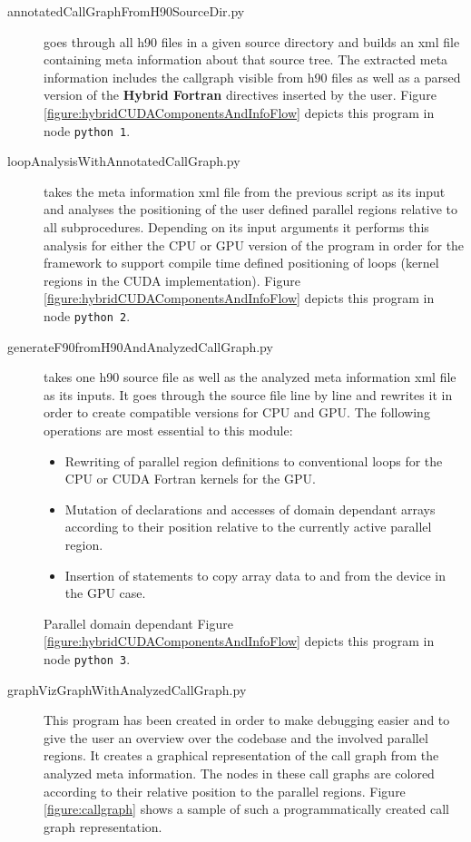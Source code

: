 \begin{description}
 \item[annotatedCallGraphFromH90SourceDir.py] goes through all h90 files in a given source directory and builds an xml file containing meta information about that source tree. The extracted meta information includes the callgraph visible from h90 files as well as a parsed version of the \textbf{Hybrid Fortran} directives inserted by the user. Figure \ref{figure:hybridCUDAComponentsAndInfoFlow} depicts this program in node \verb|python 1|.
 \item[loopAnalysisWithAnnotatedCallGraph.py] takes the meta information xml file from the previous script as its input and analyses the positioning of the user defined parallel regions relative to all subprocedures. Depending on its input arguments it performs this analysis for either the CPU or GPU version of the program in order for the framework to support compile time defined positioning of loops (kernel regions in the CUDA implementation). Figure \ref{figure:hybridCUDAComponentsAndInfoFlow} depicts this program in node \verb|python 2|.
 \item[generateF90fromH90AndAnalyzedCallGraph.py] takes one h90 source file as well as the analyzed meta information xml file as its inputs. It goes through the source file line by line and rewrites it in order to create compatible versions for CPU and GPU. The following operations are most essential to this module:
 \begin{itemize}
  \item Rewriting of parallel region definitions to conventional loops for the CPU or CUDA Fortran kernels for the GPU.
  \item Mutation of declarations and accesses of domain dependant arrays according to their position relative to the currently active parallel region.
  \item Insertion of statements to copy array data to and from the device in the GPU case.
 \end{itemize}
 Parallel domain dependant Figure \ref{figure:hybridCUDAComponentsAndInfoFlow} depicts this program in node \verb|python 3|.
 \item[graphVizGraphWithAnalyzedCallGraph.py] This program has been created in order to make debugging easier and to give the user an overview over the codebase and the involved parallel regions. It creates a graphical representation of the call graph from the analyzed meta information. The nodes in these call graphs are colored according to their relative position to the parallel regions. Figure \ref{figure:callgraph} shows a sample of such a programmatically created call graph representation.
\end{description}

